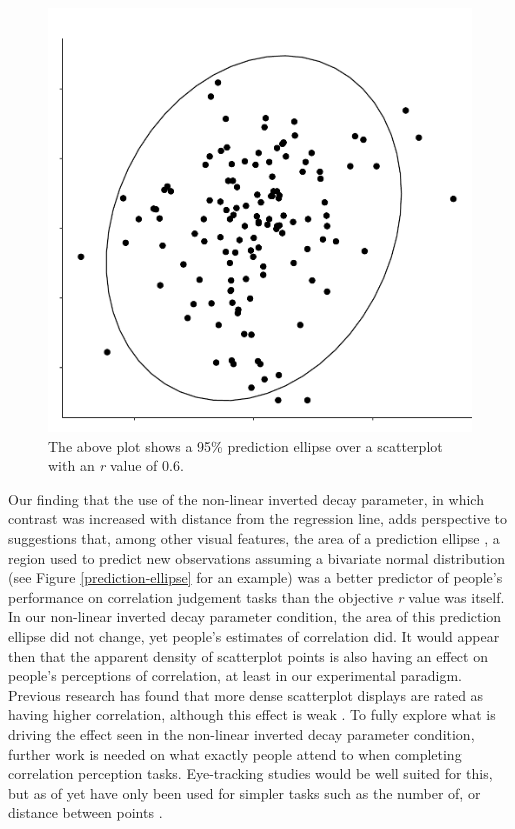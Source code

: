 \documentclass[preprint, 3p,
authoryear]{elsarticle} %
\begin{document}
\begin{figure}

\includegraphics[width=0.5\linewidth]{contrast_and_scatterplots_files/figure-latex/prediction-ellipse-1} \hfill{}

\caption{\label{prediction-ellipse}The above plot shows a 95\% prediction ellipse over a scatterplot with an \textit{r} value of 0.6.}\label{fig:prediction-ellipse}
\end{figure}

Our finding that the use of the non-linear inverted decay parameter, in
which contrast was increased with distance from the regression line,
adds perspective to suggestions \citep{yang_2019} that, among other
visual features, the area of a prediction ellipse
\citep{yang_2019, cleveland_1982}, a region used to predict new
observations assuming a bivariate normal distribution (see Figure
\ref{prediction-ellipse} for an example) was a better predictor of
people's performance on correlation judgement tasks than the objective
\emph{r} value was itself. In our non-linear inverted decay parameter
condition, the area of this prediction ellipse did not change, yet
people's estimates of correlation did. It would appear then that the
apparent density of scatterplot points is also having an effect on
people's perceptions of correlation, at least in our experimental
paradigm. Previous research has found that more dense scatterplot
displays are rated as having higher correlation, although this effect is
weak \citep{lauer_1989, rensink_2014}. To fully explore what is driving
the effect seen in the non-linear inverted decay parameter condition,
further work is needed on what exactly people attend to when completing
correlation perception tasks. Eye-tracking studies would be well suited
for this, but as of yet have only been used for simpler tasks such as
the number of, or distance between points \citep{netzel_2017}.
\end{document}
